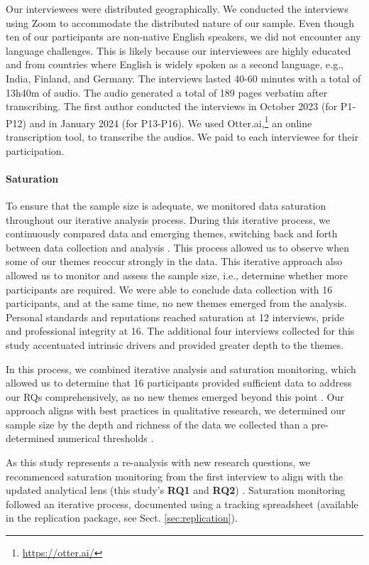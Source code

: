 Our interviewees were distributed geographically. We conducted the interviews using Zoom to accommodate the distributed nature of our sample. Even though ten of our participants are non-native English speakers, we did not encounter any language challenges. This is likely because our interviewees are highly educated and from countries where English is widely spoken as a second language, e.g., India, Finland, and Germany. The interviews lasted 40-60 minutes with a total of 13h40m of audio. The audio generated a total of 189 pages verbatim after transcribing. The first author conducted the interviews in October 2023 (for P1-P12) and in January 2024 (for P13-P16). We used Otter.ai,\footnote{\url{https://otter.ai/}} an online transcription tool, to transcribe the audios. We paid  to each interviewee for their participation.

\paragraph*{Saturation} \label{sec:saturation} To ensure that the sample size is adequate, we monitored data saturation \citep{morse2004theoretical,aldiabat2018data} throughout our iterative analysis process. During this iterative process, we continuously compared data and emerging themes, switching back and forth between data collection and analysis \citep{bowen2008naturalistic}. This process allowed us to observe when some of our themes reoccur strongly in the data. This iterative approach also allowed us to monitor and assess the sample size, i.e., determine whether more participants are required. We were able to conclude data collection with 16 participants, and at the same time, no new themes emerged from the analysis. Personal standards and reputations reached saturation at 12 interviews, pride and professional integrity at 16. The additional four interviews collected for this study accentuated intrinsic drivers and provided greater depth to the themes.

In this process, we combined iterative analysis and saturation monitoring, which allowed us to determine that 16 participants provided sufficient data to address our RQs comprehensively, as no new themes emerged beyond this point \citep{guest2006many}. Our approach aligns with best practices in qualitative research, we determined our sample size by the depth and richness of the data we collected than a pre-determined numerical thresholds \citep{guest2006many}.

As this study represents a re-analysis with new research questions, we recommenced saturation monitoring from the first interview to align with the updated analytical lens (this study's \textbf{RQ1} and \textbf{RQ2}) \citep{heaton2008secondary}. Saturation monitoring followed an iterative process, documented using a tracking spreadsheet (available in the replication package, see Sect. \ref{sec:replication}).

